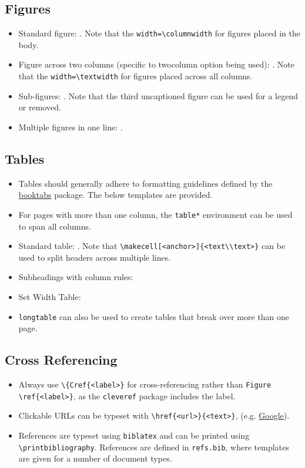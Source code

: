 \subsection{Figures}
\begin{itemize}
    \item Standard figure: . Note that the \verb|width=\columnwidth| for figures placed in the body.
    
    \item Figure across two columns (specific to twocolumn option being used): . Note that the \verb|width=\textwidth| for figures placed across all columns.
    
    \item Sub-figures: . Note that the third uncaptioned figure can be used for a legend or removed.
    
    \item Multiple figures in one line: .
    
\end{itemize}
% 
\subsection{Tables}
\begin{itemize}
    \item Tables should generally adhere to formatting guidelines defined by the \href{https://ctan.org/pkg/booktabs?lang=en}{booktabs} package. The below templates are provided.
    \item For pages with more than one column, the \verb|table*| environment can be used to span all columns.
    \item Standard table: . Note that \verb|\makecell[<anchor>]{<text\\text>}| can be used to split headers across multiple lines.
    
    \item Subheadings with column rules: 
    
    \item Set Width Table: 
    
    \item \verb|longtable| can also be used to create tables that break over more than one page.
\end{itemize}
% 
\subsection{Cross Referencing} 
\begin{itemize}
    \item Always use \verb|\{Cref{<label>}| for cross-referencing rather than \verb|Figure \ref{<label>}|, as the \verb|cleveref| package includes the label.
    \item Clickable URLs can be typeset with \verb|\href{<url>}{<text>}|, (e.g. \href{www.google.com}{Google}).
    \item References are typeset using \verb|biblatex| and can be printed using \verb|\printbibliography|. References are defined in \verb|refs.bib|, where templates are given for a number of document types.
\end{itemize}
% 
